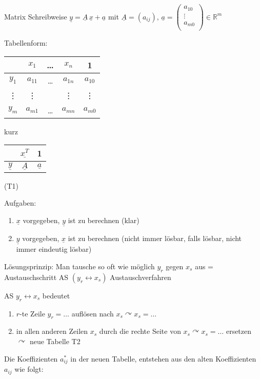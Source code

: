 \documentclass[a4paper]{scrartcl}
\begin{document}
Matrix Schreibweise $\underline{y} = \underline{A} \, \underline{x} + \underline{a}$ mit $\underline{A}=(a_{ij}), \, \underline{a} = \begin{pmatrix} a_{10}\\ \vdots \\ a_{m0}\\ \end{pmatrix} \in \mathbb{R}^m$

Tabellenform: \begin{tabular}{c|cccc}
 & $x_1$ & \dots & $x_n$ & 1\\ \hline
$y_1$ & $a_{11}$ & \dots & $a_{1n}$ & $a_{10}$\\
\vdots & \vdots & & \vdots & \vdots \\
$y_m$ & $a_{m1}$ & \dots & $ a_{mn}$ & $a_{m0}$\\
\end{tabular} kurz
\begin{tabular}{c|cc}
 & $\underline{x^T}$ & 1\\ \hline
$\underline{y}$ & $\underline{A}$ & $\underline{a}$\\
\end{tabular} (T1)

Aufgaben:\begin{enumerate}
\item $\underline{x}$ vorgegeben, $\underline{y}$ ist zu berechnen (klar)
\item $\underline{y}$ vorgegeben, $\underline{x}$ ist zu berechnen (nicht immer lösbar, falls lösbar, nicht immer eindeutig lösbar)
\end{enumerate}

Lösungsprinzip: Man tausche so oft wie möglich $y_r$ gegen $x_s$ aus = Austauschschritt AS $(y_r \leftrightarrow x_s)$ Austauschverfahren

AS $y_r \leftrightarrow x_s$ bedeutet
\begin{enumerate}
\item $r$-te Zeile $y_r = \dots$ auflösen nach $x_s \curvearrowright x_s= \dots$
\item in allen anderen Zeilen $x_s$ durch die rechte Seite von $x_s \curvearrowright x_s= \dots$ ersetzen $\curvearrowright$ neue Tabelle T2
\end{enumerate}
Die Koeffizienten $a_{ij}^*$ in der neuen Tabelle, entstehen aus den alten Koeffizienten $a_{ij}$ wie folgt:
\end{document}
